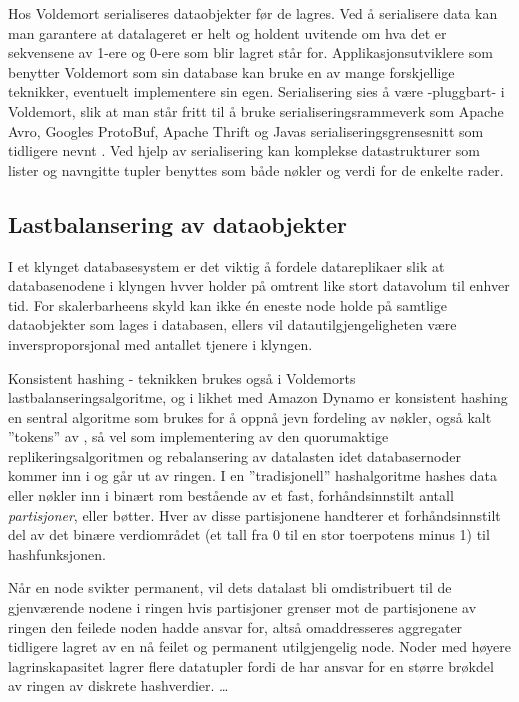 Hos Voldemort serialiseres dataobjekter før de lagres. Ved å serialisere data kan man garantere at datalageret er helt og holdent uvitende om hva det er sekvensene av 1-ere og 0-ere som blir lagret står for. Applikasjonsutviklere som benytter Voldemort som sin database kan bruke en av mange forskjellige teknikker, eventuelt implementere sin egen. Serialisering sies å være -pluggbart- i Voldemort, slik at man står fritt til å bruke serialiseringsrammeverk som Apache Avro, Googles ProtoBuf, Apache Thrift og Javas serialiseringsgrensesnitt som tidligere nevnt \citep{kreps2009}. Ved hjelp av serialisering kan komplekse datastrukturer som lister og navngitte tupler benyttes som både nøkler og verdi for de enkelte rader.

\subsection{Lastbalansering av dataobjekter}

I et klynget databasesystem er det viktig å fordele datareplikaer slik at databasenodene i klyngen hvver holder på omtrent like stort datavolum til enhver tid. For skalerbarheens skyld kan ikke én eneste node holde på samtlige dataobjekter som lages i databasen, ellers vil datautilgjengeligheten være inversproporsjonal med antallet tjenere i klyngen.

Konsistent hashing - teknikken brukes også i Voldemorts lastbalanseringsalgoritme, og i likhet med Amazon Dynamo er konsistent hashing en sentral algoritme som brukes for å oppnå jevn fordeling av nøkler, også kalt ''tokens'' av \cite{decandia2007}, så vel som implementering av den quorumaktige replikeringsalgoritmen og rebalansering av datalasten idet databasernoder kommer inn i og går ut av ringen. I en ''tradisjonell'' hashalgoritme hashes data eller nøkler inn i binært rom bestående av et fast, forhåndsinnstilt antall \emph{partisjoner}, eller bøtter. Hver av disse partisjonene handterer et forhåndsinnstilt del av det binære verdiområdet (et tall fra 0 til en stor toerpotens minus 1) til hashfunksjonen.

Når en node svikter permanent, vil dets datalast bli omdistribuert til de gjenværende nodene i ringen hvis partisjoner grenser mot de partisjonene av ringen den feilede noden hadde ansvar for, altså omaddresseres aggregater tidligere lagret av en nå feilet og permanent utilgjengelig node. Noder med høyere lagrinskapasitet lagrer flere datatupler fordi de har ansvar for en større brøkdel av ringen av diskrete hashverdier.
\ldots

